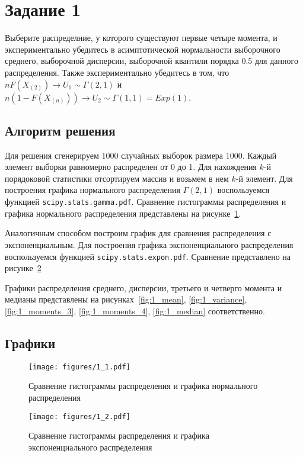 \section{Задание 1}
Выберите распределние, у которого существуют первые четыре момента,
и экспериментально убедитесь в асимптотической нормальности
выборочного среднего, выборочной дисперсии, выборочной квантили
порядка 0.5 для данного распределения.
Также экспериментально убедитесь в том, что 
\(n F(X_{(2)}) \to U_1 \sim \Gamma(2, 1) \) и
\( n(1 - F(X_{(n)})) \to U_2 \sim \Gamma(1, 1) = Exp(1) \).

\subsection{Алгоритм решения}
Для решения сгенерируем 1000 случайных выборок
размера 1000.
Каждый элемент выборки равномерно распределен от 0 до 1.
Для нахождения \(k\)-й порядоковой статистики отсортируем
массив и возьмем в нем \(k\)-й элемент.
Для построения графика нормального распределения \(\Gamma(2,1)\)
воспользуемся функцией \texttt{scipy.stats.gamma.pdf}.
Сравнение гистограммы распределения и графика нормального
распределения представлены на рисунке~\ref{fig:1_1}.

Аналогичным способом построим график для сравнения 
распределения с экспоненциальным.
Для построения графика экспоненциального распределения
воспользуемся функцией \texttt{scipy.stats.expon.pdf}.
Сравнение представлено на рисунке~\ref{fig:1_2}

Графики распределения среднего, дисперсии,
третьего и четверго момента и медианы представлены
на рисунках~\ref{fig:1_mean}, \ref{fig:1_variance}, \ref{fig:1_moments_3}, \ref{fig:1_moments_4}, \ref{fig:1_median} соответственно.

\subsection{Графики}

\begin{figure}[H]
  \centering
    \texttt{[image: figures/1\_1.pdf]}
  \caption{Сравнение гистограммы распределения и графика нормального
распределения}\label{fig:1_1}
\end{figure}

\begin{figure}[H]
  \centering
    \texttt{[image: figures/1\_2.pdf]}
  \caption{Сравнение гистограммы распределения и графика экспоненциального распределения}\label{fig:1_2}
\end{figure}

